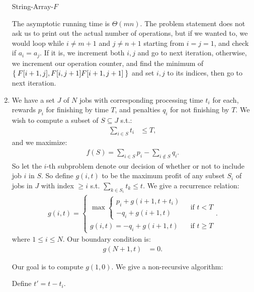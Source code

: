 \documentclass[10pt,oneside,reqno]{amsart}
\makeatletter
\theoremstyle{plain}
\theoremstyle{definition}
\theoremstyle{remark}
\newcommand{\sub}{\subseteq}
\newcommand{\bb}{\vspace{3mm}}
\newcommand{\bee}{\begin{equation}\begin{aligned}}
\newcommand{\eee}{\end{aligned}\end{equation}}
\newenvironment{restoretext}%
    {\@parboxrestore%
     \begin{adjustwidth}{}{\leftmargin}%
    }{\end{adjustwidth}
     }
\makeatother
\begin{document}
\begin{enumerate}[label=\arabic*.]
\begin{restoretext}
\begin{algorithm}[H]
{{{{		}
	}
}
}
\caption{String-Array-$F$}
\end{algorithm}
\end{restoretext}
The asymptotic running time is $\Theta(mn)$. The problem statement does not ask us to print out the actual number of operations, but if we wanted to, we would loop while $i \neq m  + 1$ and $j \neq n + 1$ starting from $i = j = 1$, and check if $a_i = a_j$. If it is, we increment both $i,j$ and go to next iteration, otherwise, we increment our operation counter, and find the minimum of $\Set{F[i + 1,j],F[i,j + 1]F[i + 1,j + 1]}$ and set $i,j$ to its indices, then go to next iteration. 





\bb



\item We have a set $J$ of $N$ jobs with corresponding processing time $t_i$ for each, rewards $p_i$ for finishing by time $T$, and penalties $q_i$ for not finishing by $T$. We wish to compute a subset of $S \sub J$ s.t.:
\bee
\sum_{i \in S} t_i &\leq T,
\eee
and we maximize:
\bee
f(S) = \sum_{i \in S}p_i - \sum_{i \notin S}q_i.
\eee
So let the $i$-th subproblem denote our decision of whether or not to include job $i$ in $S$. So define $g(i,t)$ to be the maximum profit of any subset $S_i$ of jobs in $J$ with index $\geq i$ s.t. $\sum_{k \in S_i} t_k \leq t$. We give a recurrence relation:
\bee
g(i,t) = \begin{cases}
\max \begin{cases}
p_i + g(i + 1,t + t_i)\\
-q_i + g(i + 1,t)
\end{cases} & \text{ if }t < T\\
g(i,t) = -q_i + g(i + 1,t)  & \text{ if }t \geq T
\end{cases}. 
\eee
where $1 \leq i \leq N$. Our boundary condition is:
\bee
g(N + 1,t) &= 0.
\eee

Our goal is to compute $g(1,0)$. We give a non-recursive algorithm:

Define $t' = t - t_i$. 
\begin{restoretext}
\begin{algorithm}[H]\label{alg3}
\end{algorithm}
\end{restoretext}
\end{enumerate}
\end{document}
